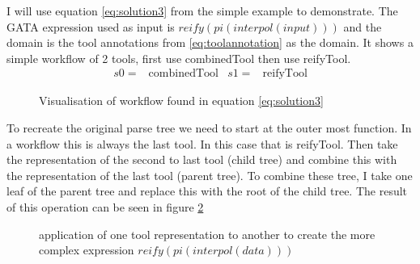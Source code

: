 \documentclass{article}
\begin{document}
I will use equation \ref{eq:solution3} from the simple example to demonstrate. The GATA expression used as input is $reify(pi(interpol(input)))$ and the domain is the tool annotations from \ref{eq:toolannotation} as the domain. It shows a simple workflow of 2 tools, first use combinedTool then use reifyTool. 
\\
\begin{align}
    s0=& \text{combinedTool} & s1=&\text{reifyTool} \label{eq:solution3}
\end{align}
\begin{figure}[H]
    \centering
    \caption{Visualisation of workflow found in equation \ref{eq:solution3} }
    \label{fig:my_label}
\end{figure}

To recreate the original parse tree we need to start at the outer most function. In a workflow this is always the last tool. In this case that is reifyTool. Then take the representation of the second to last tool (child tree) and combine this with the representation of the last tool (parent tree). To combine these tree, I take one leaf of the parent tree and replace this with the root of the child tree. The result of this operation can be seen in figure \ref{fig:combineGATA}

\begin{figure}[H]
    \centering
   
    
    \caption{application of one tool representation to another to create the more complex expression   $reify(pi(interpol(data)))$}
  \label{fig:combineGATA}
\end{figure}
\end{document}
